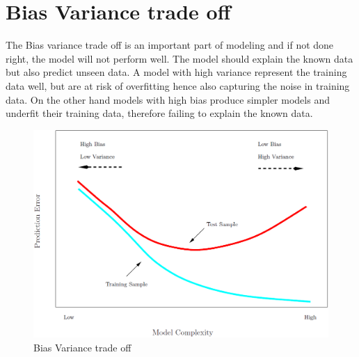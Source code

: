 \section {Bias Variance trade off}
The Bias variance trade off is an important part of modeling and if not done right, the model will not perform well. The model should explain the known data but also predict unseen data. A model with high variance represent the training data well, but are at risk of overfitting hence also capturing the noise in training data. On the other hand models with high bias produce simpler models and underfit their training data, therefore failing to explain the known data.

\begin{figure}[H]
	\centering
	\includegraphics[width=0.5\linewidth]{crossValidation/biasVariance}
	\caption{Bias Variance trade off}
	\label{fig:biasvariance}
\end{figure}
